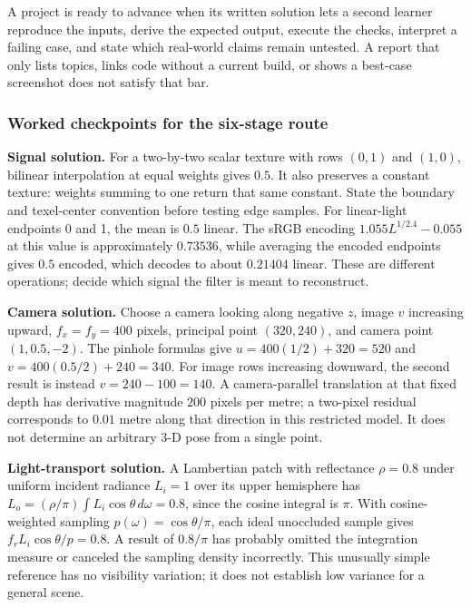 A project is ready to advance when its written solution lets a second learner reproduce the inputs, derive the expected output, execute the checks, interpret a failing case, and state which real-world claims remain untested. A report that only lists topics, links code without a current build, or shows a best-case screenshot does not satisfy that bar.

\subsubsection{Worked checkpoints for the six-stage route}\label{03-visual-computing-i-ch001-worked-checkpoints-for-the-six-stage-route}

\textbf{Signal solution.} For a two-by-two scalar texture with rows \((0,1)\) and \((1,0)\), bilinear interpolation at equal weights gives \(0.5\). It also preserves a constant texture: weights summing to one return that same constant. State the boundary and texel-center convention before testing edge samples. For linear-light endpoints 0 and 1, the mean is \(0.5\) linear. The sRGB encoding \(1.055L^{1/2.4}-0.055\) at this value is approximately \(0.73536\), while averaging the encoded endpoints gives \(0.5\) encoded, which decodes to about \(0.21404\) linear. These are different operations; decide which signal the filter is meant to reconstruct.

\textbf{Camera solution.} Choose a camera looking along negative \(z\), image \(v\) increasing upward, \(f_x=f_y=400\) pixels, principal point \((320,240)\), and camera point \((1,0.5,-2)\). The pinhole formulas give \(u=400(1/2)+320=520\) and \(v=400(0.5/2)+240=340\). For image rows increasing downward, the second result is instead \(v=240-100=140\). A camera-parallel translation at that fixed depth has derivative magnitude \(200\) pixels per metre; a two-pixel residual corresponds to \(0.01\) metre along that direction in this restricted model. It does not determine an arbitrary 3-D pose from a single point.

\textbf{Light-transport solution.} A Lambertian patch with reflectance \(\rho=0.8\) under uniform incident radiance \(L_i=1\) over its upper hemisphere has \(L_o=(\rho/\pi)\int L_i\cos\theta\,d\omega=0.8\), since the cosine integral is \(\pi\). With cosine-weighted sampling \(p(\omega)=\cos\theta/\pi\), each ideal unoccluded sample gives \(f_rL_i\cos\theta/p=0.8\). A result of \(0.8/\pi\) has probably omitted the integration measure or canceled the sampling density incorrectly. This unusually simple reference has no visibility variation; it does not establish low variance for a general scene.


